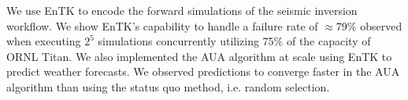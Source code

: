 We use EnTK to encode the forward simulations of the seismic inversion workflow.
We show EnTK's capability to handle a failure rate of \(\approx\)79\% observed
when executing $2^5$ simulations concurrently utilizing 75\% of the capacity 
of ORNL Titan. We also implemented the AUA algorithm at scale using EnTK 
to predict weather forecasts. We observed predictions to converge faster in the 
AUA algorithm than using the status quo method, i.e. random selection.






